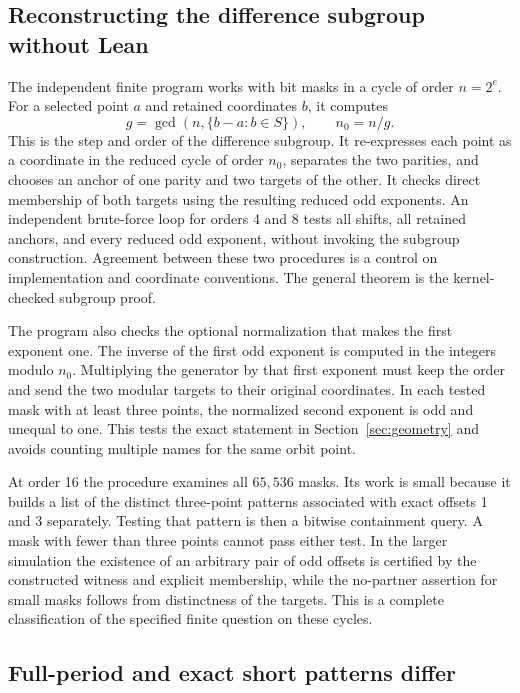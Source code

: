 \documentclass[12pt,letterpaper]{article}
\begin{document}
\subsection{Reconstructing the difference subgroup without Lean}

The independent finite program works with bit masks in a cycle of order \(n=2^e\). For a selected point \(a\) and retained coordinates \(b\), it computes
\[
                 g=\gcd(n,\{b-a:b\in S\}),\qquad n_0=n/g .
\]
This is the step and order of the difference subgroup. It re-expresses each point as a coordinate in the reduced cycle of order \(n_0\), separates the two parities, and chooses an anchor of one parity and two targets of the other. It checks direct membership of both targets using the resulting reduced odd exponents. An independent brute-force loop for orders 4 and 8 tests all shifts, all retained anchors, and every reduced odd exponent, without invoking the subgroup construction. Agreement between these two procedures is a control on implementation and coordinate conventions. The general theorem is the kernel-checked subgroup proof.

The program also checks the optional normalization that makes the first exponent one. The inverse of the first odd exponent is computed in the integers modulo \(n_0\). Multiplying the generator by that first exponent must keep the order and send the two modular targets to their original coordinates. In each tested mask with at least three points, the normalized second exponent is odd and unequal to one. This tests the exact statement in Section~\ref{sec:geometry} and avoids counting multiple names for the same orbit point.

At order 16 the procedure examines all \(65{,}536\) masks. Its work is small because it builds a list of the distinct three-point patterns associated with exact offsets 1 and 3 separately. Testing that pattern is then a bitwise containment query. A mask with fewer than three points cannot pass either test. In the larger simulation the existence of an arbitrary pair of odd offsets is certified by the constructed witness and explicit membership, while the no-partner assertion for small masks follows from distinctness of the targets. This is a complete classification of the specified finite question on these cycles.

\subsection{Full-period and exact short patterns differ}
\end{document}
